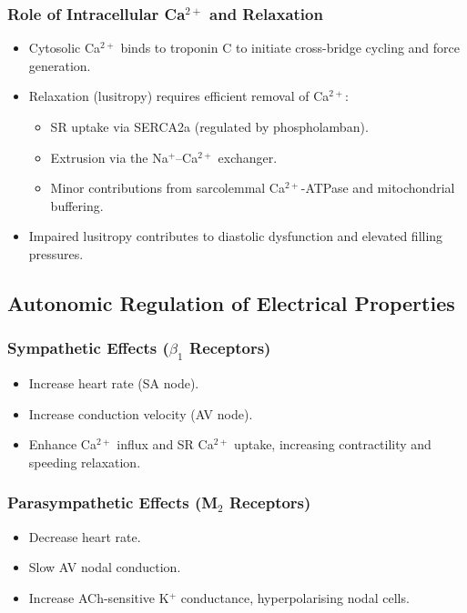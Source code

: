 \documentclass[11pt,a4paper]{article}
\begin{document}
\subsubsection{Role of Intracellular Ca$^{2+}$ and Relaxation}

\begin{itemize}
  \item Cytosolic Ca$^{2+}$ binds to troponin C to initiate cross-bridge cycling and force generation.
  \item Relaxation (lusitropy) requires efficient removal of Ca$^{2+}$:
    \begin{itemize}
      \item SR uptake via SERCA2a (regulated by phospholamban).
      \item Extrusion via the Na$^+$--Ca$^{2+}$ exchanger.
      \item Minor contributions from sarcolemmal Ca$^{2+}$-ATPase and mitochondrial buffering.
    \end{itemize}
  \item Impaired lusitropy contributes to diastolic dysfunction and elevated filling pressures.
\end{itemize}

\subsection{Autonomic Regulation of Electrical Properties}

\subsubsection{Sympathetic Effects ($\beta_1$ Receptors)}

\begin{itemize}
  \item Increase heart rate (SA node).
  \item Increase conduction velocity (AV node).
  \item Enhance Ca$^{2+}$ influx and SR Ca$^{2+}$ uptake, increasing contractility and speeding relaxation.
\end{itemize}

\subsubsection{Parasympathetic Effects (M$_2$ Receptors)}

\begin{itemize}
  \item Decrease heart rate.
  \item Slow AV nodal conduction.
  \item Increase ACh-sensitive K$^+$ conductance, hyperpolarising nodal cells.
\end{itemize}
\end{document}
